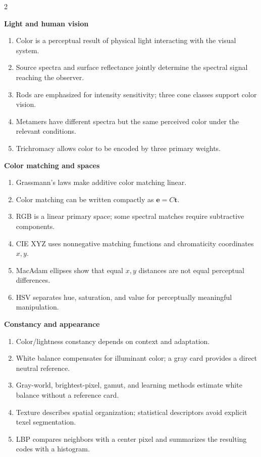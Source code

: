 \documentclass[11pt,a4paper,oneside]{report}
\newcommand{\reviewgroup}[1]{%
  \par\vspace{0.7em}%
  {\sffamily\bfseries\color{SapienzaRed}#1}\par\vspace{0.10em}%
}
\begin{document}
\begin{multicols}{2}
\normalsize
\reviewgroup{Light and human vision}
\begin{enumerate}[label=\textcolor{SapienzaRed}{\bfseries\arabic*.},leftmargin=1.8em,itemsep=0.40em]
\item Color is a perceptual result of physical light interacting with the visual system.
\item Source spectra and surface reflectance jointly determine the spectral signal reaching the observer.
\item Rods are emphasized for intensity sensitivity; three cone classes support color vision.
\item Metamers have different spectra but the same perceived color under the relevant conditions.
\item Trichromacy allows color to be encoded by three primary weights.
\end{enumerate}
\reviewgroup{Color matching and spaces}
\begin{enumerate}[resume,label=\textcolor{SapienzaRed}{\bfseries\arabic*.},leftmargin=1.8em,itemsep=0.40em]
\item Grassmann's laws make additive color matching linear.
\item Color matching can be written compactly as $\mathbf e=C\mathbf t$.
\item RGB is a linear primary space; some spectral matches require subtractive components.
\item CIE XYZ uses nonnegative matching functions and chromaticity coordinates $x,y$.
\item MacAdam ellipses show that equal $x,y$ distances are not equal perceptual differences.
\item HSV separates hue, saturation, and value for perceptually meaningful manipulation.
\end{enumerate}
\reviewgroup{Constancy and appearance}
\begin{enumerate}[resume,label=\textcolor{SapienzaRed}{\bfseries\arabic*.},leftmargin=1.8em,itemsep=0.40em]
\item Color/lightness constancy depends on context and adaptation.
\item White balance compensates for illuminant color; a gray card provides a direct neutral reference.
\item Gray-world, brightest-pixel, gamut, and learning methods estimate white balance without a reference card.
\item Texture describes spatial organization; statistical descriptors avoid explicit texel segmentation.
\item LBP compares neighbors with a center pixel and summarizes the resulting codes with a histogram.
\end{enumerate}
\end{multicols}
\end{document}
